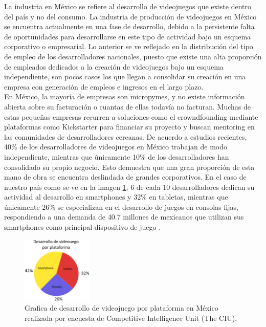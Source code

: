 La industria en México se refiere al desarrollo de videojuegos que existe dentro del país y no del consumo. La industria de producción de videojuegos en México se encuentra actualmente en una fase de desarrollo, debido a la persistente falta de oportunidades para desarrollarse en este tipo de actividad bajo un esquema corporativo o empresarial. Lo anterior se ve reflejado en la distribución del tipo de empleo de los desarrolladores nacionales, puesto que existe una alta proporción de empleados dedicados a la creación de videojuegos bajo un esquema independiente, son pocos casos los que llegan a consolidar su creación en una empresa con generación de empleos e ingresos en el largo plazo.
\\[1pt]

En México, la mayoría de empresas son micropymes, y no existe información abierta sobre su facturación o cuantas de ellas todavía no facturan. Muchas de estas pequeñas empresas recurren a soluciones como el crowndfounding mediante plataformas como Kickstarter para financiar su proyecto y buscan mentoring en las comunidades de desarrolladores cercanas\cite{vid05}. De acuerdo a estudios recientes, 40\% de los desarrolladores de videojuegos en México trabajan de modo independiente, mientras que únicamente 10\% de los desarrolladores han consolidado su propio negocio. Esto demuestra que una gran proporción de esta mano de obra se encuentra deslindada de grandes corporativos. En el caso de nuestro país como se ve en la imagen \ref{fig:desVj}, 6 de cada 10 desarrolladores dedican su actividad al desarrollo en smartphones y 32\% en tabletas, mientras que únicamente 26\% se especializan en el desarrollo de juegos en consolas fijas, respondiendo a una demanda de 40.7 millones de mexicanos que utilizan sus smartphones como principal dispositivo de juego \cite{vid04}.
\\[1pt]
\begin{figure}
	\centering
	\includegraphics[width=0.3\textwidth]{03MarcoTeorico/imageR/desVj}
	\caption{Grafica de desarrollo de videojuego por plataforma en México realizada por encuesta de Competitive Intelligence Unit (The CIU).}
	\label{fig:desVj}
\end{figure}

